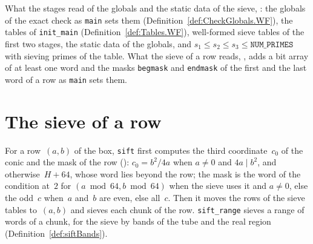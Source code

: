 \begin{definition}\label{def:IsStageSetup}
  \leanok
  What the stages read of the globals and the static data of the sieve,
  : the globals of the exact check as \texttt{main} sets them
  (Definition~\ref{def:CheckGlobals.WF}), the tables of \texttt{init\_main}
  (Definition~\ref{def:Tables.WF}), well-formed sieve tables of the first two stages, the static
  data of the globals, and $s_1 \le s_2 \le s_3 \le \texttt{NUM\_PRIMES}$ with sieving primes of
  the table. What the sieve of a row reads, , adds a bit array of at
  least one word and the masks \texttt{begmask} and \texttt{endmask} of the first and the last
  word of a row as \texttt{main} sets them.
\end{definition}

\section{The sieve of a row}\label{sec:siftRow}

For a row~$(a, b)$ of the box, \texttt{sift} first computes the third coordinate~$c_0$ of the conic
and the mask of the row (): $c_0 = b^2/4a$ when $a \ne 0$ and
$4 a \mid b^2$, and otherwise~$H + 64$, whose word lies beyond the row; the mask is the word of the
condition at~$2$ for $(a \bmod 64, b \bmod 64)$ when the sieve uses it and $a \ne 0$, else the
odd~$c$ when~$a$ and~$b$ are even, else all~$c$. Then it moves the rows of the sieve tables
to~$(a, b)$ and sieves each chunk of the row. \texttt{sift\_range} sieves a range of words of a chunk,
for the sieve by bands of the tube and the real region (Definition~\ref{def:siftBands}).

